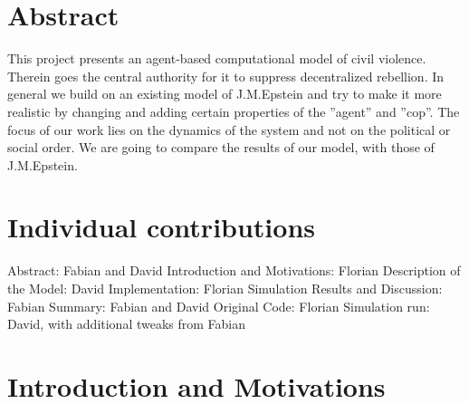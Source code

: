 \documentclass[11pt]{article}
\begin{document}
\newpage




\section{Abstract}

This project presents an agent-based computational model of civil violence. Therein goes the central authority for it to suppress decentralized  rebellion. In general we build on an existing model of J.M.Epstein and try to make it more realistic by changing and adding certain properties of the ''agent'' and ''cop''. The focus of our work lies on the dynamics of the system and not on the political or social order. We are going to compare the results of our model, with those of J.M.Epstein.

\section{Individual contributions}

Abstract: Fabian and David\newline
Introduction and Motivations: Florian\newline
Description of the Model: David\newline
Implementation: Florian\newline
Simulation Results and Discussion: Fabian\newline
Summary: Fabian and David\newline
\newline\newline
Original Code: Florian\newline
Simulation run: David, with additional tweaks from Fabian\newline
\newpage

\section{Introduction and Motivations}
\end{document}

